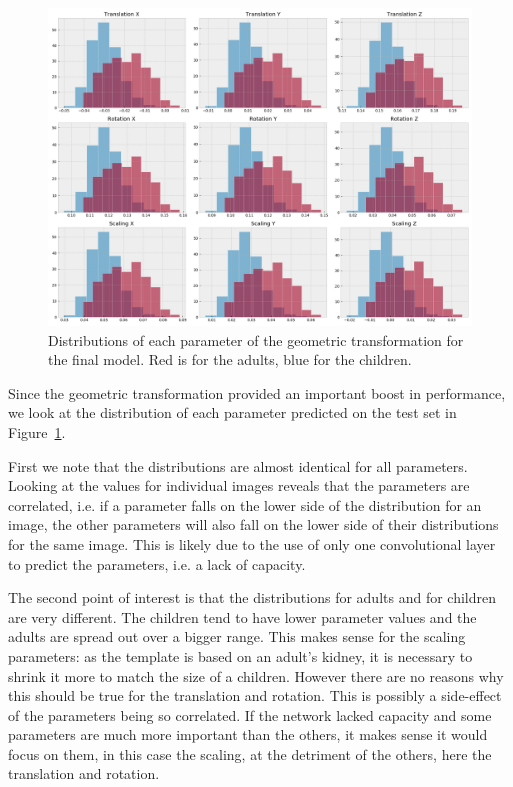 \begin{figure}[htbp]
    \centering
	\includegraphics[width=\textwidth]{img_seg/transfo_matrix}
    \caption[Distributions of each parameter of the geometric transformation for the final model]{Distributions of each parameter of the geometric transformation for the final model. Red is for the adults, blue for the children.}
    \label{fig:transfo_matrix}
\end{figure}

Since the geometric transformation provided an important boost in performance, we look at the distribution of each parameter predicted on the test set in Figure~\ref{fig:transfo_matrix}. 

First we note that the distributions are almost identical for all parameters. Looking at the values for individual images reveals that the parameters are correlated, i.e. if a parameter falls on the lower side of the distribution for an image, the other parameters will also fall on the lower side of their distributions for the same image. This is likely due to the use of only one convolutional layer to predict the parameters, i.e. a lack of capacity.

The second point of interest is that the distributions for adults and for children are very different. The children tend to have lower parameter values and the adults are spread out over a bigger range. This makes sense for the scaling parameters: as the template is based on an adult's kidney, it is necessary to shrink it more to match the size of a children. However there are no reasons why this should be true for the translation and rotation. This is possibly a side-effect of the parameters being so correlated. If the network lacked capacity and some parameters are much more important than the others, it makes sense it would focus on them, in this case the scaling, at the detriment of the others, here the translation and rotation.

